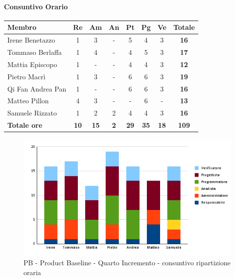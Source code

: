 \paragraph{Consuntivo Orario}
\begin{center}
	\renewcommand{\arraystretch}{1.8} %
	\begin{tabular}{ |m{8em}|c|c|c|c|c|c|c| }
	\hline
	\textbf{Membro} & \textbf{Re} & \textbf{Am} &  \textbf{An} &  \textbf{Pt} &  \textbf{Pg} &  \textbf{Ve} &  \textbf{Totale}\\
    \hline
    Irene Benetazzo   & 1 & 3  & - & 5 & 4 & 3 & \textbf{16} \\
    \hline
    Tommaso Berlaffa  & 1 & 4  & - & 4 & 5 & 3 & \textbf{17} \\
    \hline
    Mattia Episcopo   & 1 & - & - & 4 & 4 & 3 & \textbf{12} \\
    \hline
    Pietro Macrì      & 1 & 3  & - & 6 & 6 & 3 & \textbf{19} \\
    \hline
    Qi Fan Andrea Pan & 1 & - & - & 6 & 6 & 3 & \textbf{16} \\
    \hline
    Matteo Pillon     & 4 &3  & - & - & 6 & - & \textbf{13} \\
    \hline
    Samuele Rizzato   & 1 &2  &2 & 4 & 4 & 3 & \textbf{16} \\
    \hline
    \textbf{Totale ore} & \textbf{10} & \textbf{15} & \textbf{2} & \textbf{29} & \textbf{35} & \textbf{18} & \textbf{109} \\
    \hline
	\end{tabular}
\end{center}
\begin{figure}[H]
    \centering\includegraphics[width=\textwidth, height=\textheight,keepaspectratio]{images/consuntivo/consuntivo-PB-ore-quarto-incremento.png}
    \caption{PB - Product Baseline - Quarto Incremento - consuntivo ripartizione oraria}
\end{figure}
\newpage

